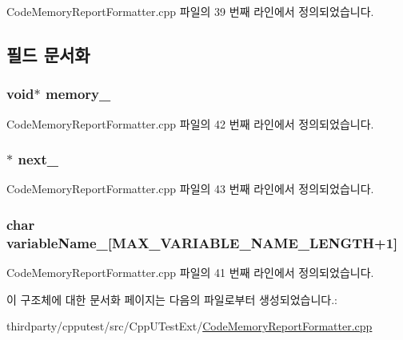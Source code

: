 Code\+Memory\+Report\+Formatter.\+cpp 파일의 39 번째 라인에서 정의되었습니다.



\subsection{필드 문서화}
\subsubsection[{\texorpdfstring{memory\+\_\+}{memory_}}]{\setlength{\rightskip}{0pt plus 5cm}void$\ast$ memory\+\_\+}\hypertarget{struct_code_reporting_allocation_node_a2873ecb79916c84dc21bb9a27876a46c}{}\label{struct_code_reporting_allocation_node_a2873ecb79916c84dc21bb9a27876a46c}


Code\+Memory\+Report\+Formatter.\+cpp 파일의 42 번째 라인에서 정의되었습니다.

\subsubsection[{\texorpdfstring{next\+\_\+}{next_}}]{$\ast$ next\+\_\+}\hypertarget{struct_code_reporting_allocation_node_a8f0c58c5a02860822d947c32e435bd3c}{}\label{struct_code_reporting_allocation_node_a8f0c58c5a02860822d947c32e435bd3c}


Code\+Memory\+Report\+Formatter.\+cpp 파일의 43 번째 라인에서 정의되었습니다.

\subsubsection[{\texorpdfstring{variable\+Name\+\_\+}{variableName_}}]{\setlength{\rightskip}{0pt plus 5cm}char variable\+Name\+\_\+\mbox{[}{\bf M\+A\+X\+\_\+\+V\+A\+R\+I\+A\+B\+L\+E\+\_\+\+N\+A\+M\+E\+\_\+\+L\+E\+N\+G\+TH}+1\mbox{]}}\hypertarget{struct_code_reporting_allocation_node_ac6f8a20a992369f629ef7f014c8a884e}{}\label{struct_code_reporting_allocation_node_ac6f8a20a992369f629ef7f014c8a884e}


Code\+Memory\+Report\+Formatter.\+cpp 파일의 41 번째 라인에서 정의되었습니다.



이 구조체에 대한 문서화 페이지는 다음의 파일로부터 생성되었습니다.\+:\begin{DoxyCompactItemize}
\item 
thirdparty/cpputest/src/\+Cpp\+U\+Test\+Ext/\hyperlink{_code_memory_report_formatter_8cpp}{Code\+Memory\+Report\+Formatter.\+cpp}\end{DoxyCompactItemize}
